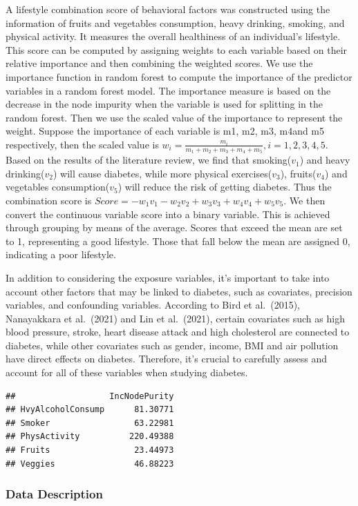 \documentclass[
  12pt,
]{article}
\begin{document}
A lifestyle combination score of behavioral factors was constructed
using the information of fruits and vegetables consumption, heavy
drinking, smoking, and physical activity. It measures the overall
healthiness of an individual's lifestyle. This score can be computed by
assigning weights to each variable based on their relative importance
and then combining the weighted scores. We use the importance function
in random forest to compute the importance of the predictor variables in
a random forest model. The importance measure is based on the decrease
in the node impurity when the variable is used for splitting in the
random forest. Then we use the scaled value of the importance to
represent the weight. Suppose the importance of each variable is m1, m2,
m3, m4and m5 respectively, then the scaled value is
\(w_i=\frac{m_i}{m_1+m_2+m_3+m_4+m_5}, i=1,2,3,4,5\). Based on the
results of the literature review, we find that smoking(\(v_1\)) and
heavy drinking(\(v_2\)) will cause diabetes, while more physical
exercises(\(v_3\)), fruits(\(v_4\)) and vegetables consumption(\(v_5\))
will reduce the risk of getting diabetes. Thus the combination score is
\(Score=-w_1v_1-w_2v_2+w_3v_3+w_4v_4+w_5v_5\). We then convert the
continuous variable score into a binary variable. This is achieved
through grouping by means of the average. Scores that exceed the mean
are set to 1, representing a good lifestyle. Those that fall below the
mean are assigned 0, indicating a poor lifestyle.

In addition to considering the exposure variables, it's important to
take into account other factors that may be linked to diabetes, such as
covariates, precision variables, and confounding variables. According to
Bird et al.~(2015), Nanayakkara et al.~(2021) and Lin et al.~(2021),
certain covariates such as high blood pressure, stroke, heart disease
attack and high cholesterol are connected to diabetes, while other
covariates such as gender, income, BMI and air pollution have direct
effects on diabetes. Therefore, it's crucial to carefully assess and
account for all of these variables when studying diabetes.

\begin{verbatim}
##                   IncNodePurity
## HvyAlcoholConsump      81.30771
## Smoker                 63.22981
## PhysActivity          220.49388
## Fruits                 23.44973
## Veggies                46.88223
\end{verbatim}

\hypertarget{data-description}{%
\subsubsection{Data Description}\label{data-description}}
\end{document}

